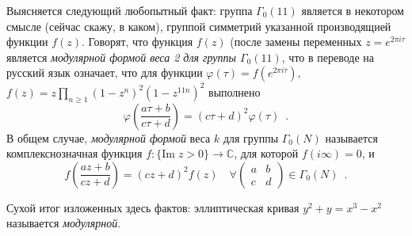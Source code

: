 \documentclass[a5paper]{article}
\theoremstyle{definition}
\newtheorem*{theorem}{Теорема}
\begin{document}
Выясняется следующий любопытный факт: группа \( \Gamma_0(11) \) является в
некотором смысле (сейчас скажу, в каком), группой симметрий указанной
производящией функции \( f(z) \). Говорят, что функция \( f(z) \) (после замены
переменных \( z = e^{2 \pi i \tau} \) является \textit{модулярной формой веса 2
для группы \( \Gamma_0(11) \)}, что в переводе на русский язык означает, что для
функции \( \varphi(\tau) = f(e^{2 \pi i \tau} ) \), \(f(z) = z \prod_{n \geq
1}(1 - z^n)^2 (1 - z^{11 n})^2 \) выполнено
\[
    \varphi\left(
        \dfrac{a\tau + b}{c \tau + d}
    \right)
     = (c \tau + d)^2 \varphi(\tau) \enspace .
\]
В общем случае, \textit{модулярной формой} веса \( k \) для группы \(
\Gamma_0(N) \) называется комплекснозначная функция \( f \colon \{\mathrm{Im}\;
z > 0\} \to \mathbb C \), для которой \(f (i \infty) = 0 \), и
\[
    f\left(
        \dfrac{az + b}{c z + d}
    \right)
     = (c z + d)^2 f(z) \quad \forall \begin{pmatrix}a & b \\ c&d
\end{pmatrix}  \in \Gamma_0(N) \enspace .
\]

Сухой итог изложенных здесь фактов: эллиптическая кривая \( y^2 + y = x^3 - x^2
\) называется \textit{модулярной}.




\end{document}
